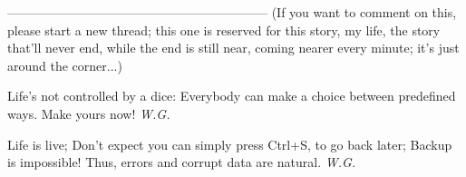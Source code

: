 --------------------------------------------------------------
(If you want to comment on this, please start a new thread; this one is reserved for this story, my life, the story that'll never end, while the end is still near, coming nearer every minute; it's just around the corner...)

Life's not controlled by a dice:
Everybody can make a choice between predefined ways. 
Make yours now!
\emph{W.G.}

Life is live;
Don't expect you can simply press Ctrl+S,
to go back later;
Backup is impossible!
Thus,
errors and corrupt data
are natural. 
\emph{W.G.}
